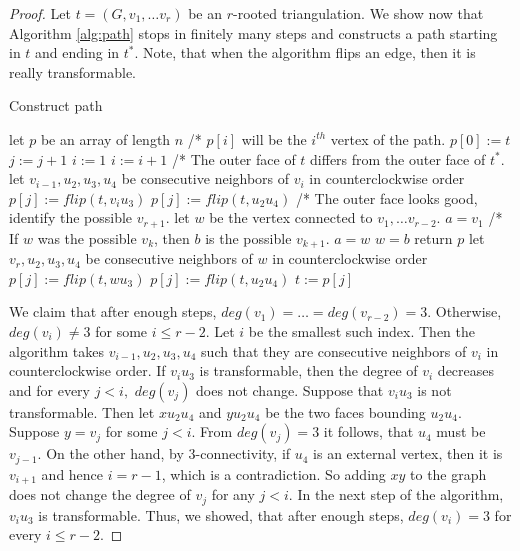 \begin{proof}
  Let $t = (G, v_1, \dots v_r)$ be an $r$-rooted triangulation. We show now that
  Algorithm \ref{alg:path} stops in finitely many steps and constructs a path
  starting in $t$ and ending in $t^*$. Note, that when the algorithm flips an
  edge, then it is really transformable.
  \begin{algorithm}
    \caption{Construct path} \label{alg:path}
    \begin{algorithmic}
      \linespread{1.0}
      \small{
      \STATE let $p$ be an array of length $n$ /* $p[i]$ will be the $i^{th}$ vertex of the path.
      \STATE $p[0] := t$
      \WHILE{\TRUE}
        \STATE $j := j + 1$
        \STATE $i := 1$
          \STATE $i := i + 1$
        \ENDWHILE
          \STATE /* The outer face of $t$ differs from the outer face of $t^*$.
          \STATE let $v_{i - 1}, u_2, u_3, u_4$ be consecutive neighbors of $v_i$ in
          counterclockwise order
            \STATE $p[j] := flip(t, v_iu_3)$
          \ELSE
            \STATE $p[j] := flip(t, u_2u_4)$
          \ENDIF
        \ELSE
          \STATE /* The outer face looks good, identify the possible $v_{r+1}$.
          \STATE let $w$ be the vertex connected to $v_1, \dots v_{r - 2}$.
          \STATE $a = v_1$
            \STATE /* If $w$ was the possible $v_k$, then $b$ is the possible $v_{k + 1}$.
            \STATE $a = w$
            \STATE $w = b$
          \ENDWHILE
            \STATE return $p$
          \ELSE
            \STATE let $v_r, u_2, u_3, u_4$ be consecutive neighbors of $w$ in
            counterclockwise order
              \STATE $p[j] := flip(t, wu_3)$
            \ELSE
              \STATE $p[j] := flip(t, u_2u_4)$
            \ENDIF
          \ENDIF
        \ENDIF
        \STATE $t := p[j]$
      \ENDWHILE}
    \end{algorithmic}
  \end{algorithm}
  \linespread{1.3}


  We claim that after enough steps, $deg(v_1) = \dots = deg(v_{r - 2}) = 3$.
  Otherwise, $deg(v_i) \neq 3$ for some $i \le r - 2$. Let $i$ be the smallest such index.
  Then the algorithm takes $v_{i - 1}, u_2, u_3, u_4$ such that they are consecutive neighbors of $v_i$
  in counterclockwise order. If $v_iu_3$ is transformable, then the degree of $v_i$
  decreases and for every $j < i,$ $deg(v_j)$ does not change. Suppose that $v_iu_3$
  is not transformable. Then let $xu_2u_4$ and $yu_2u_4$ be the two faces bounding $u_2u_4$.
  Suppose $y = v_j$ for some $j < i$. From $deg(v_j) = 3$ it follows, that $u_4$ must be $v_{j - 1}$.
  On the other hand, by $3$-connectivity, if $u_4$ is an external vertex, then it
  is $v_{i + 1}$ and hence $i = r - 1$, which is a contradiction. So adding $xy$ to the graph
  does not change the degree of $v_j$ for any $j < i$. In the next step of the algorithm,
  $v_iu_3$ is transformable. Thus, we showed, that after enough steps, $deg(v_i) = 3$ for every $i \le r - 2$.


\end{proof}
